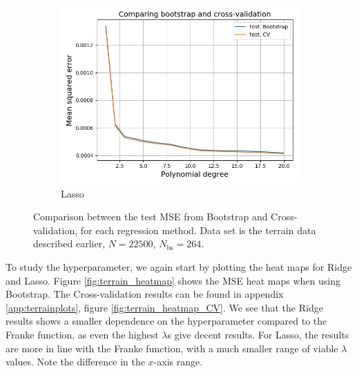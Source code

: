 \documentclass[a4paper]{article}
\begin{document}
\begin{figure}[H]
\begin{subfigure}{0.49\textwidth}
    \includegraphics[scale=0.45]{../figures/task_g/Lasso/test_compare_BS_CV_p20_N22500_patch1_pmax20_nlamb15_Lasso_Nbs264_k5_opt1.png}
    \caption{Lasso}
  \end{subfigure}
  \caption{Comparison between the test MSE from Bootstrap and Cross-validation, for each regression method. Data set is the terrain data described earlier, $N=22500$, $N_{\text{bs}} = 264$.}
  \label{fig:mse_testcomp_terrain}
\end{figure}
To study the hyperparameter, we again start by plotting the heat maps for Ridge and Lasso. Figure \ref{fig:terrain_heatmap} shows the MSE heat maps when using Bootstrap. The Cross-validation results can be found in appendix \ref{app:terrainplots}, figure \ref{fig:terrain_heatmap_CV}. We see that the Ridge results shows a smaller dependence on the hyperparameter compared to the Franke function, as even the highest $\lambda$s give decent results. For Lasso, the results are more in line with the Franke function, with a much smaller range of viable $\lambda$ values. Note the difference in the $x$-axis range.
\end{document}
